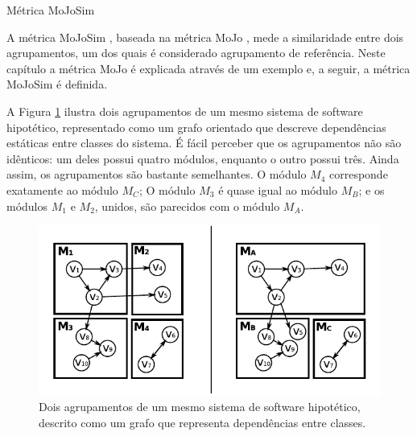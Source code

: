 \begin{chapter}{Métrica MoJoSim} \label{cap:mojosim}

A métrica MoJoSim \cite{Bittencourt2009}, baseada na métrica MoJo \cite{Tzerpos1999}, mede a similaridade entre dois agrupamentos, um dos quais é considerado agrupamento de referência. Neste capítulo a métrica MoJo é explicada através de um exemplo e, a seguir, a métrica MoJoSim é definida.



A Figura \ref{fig:mojo} ilustra dois agrupamentos de um mesmo sistema de software hipotético, representado como um grafo orientado que descreve dependências estáticas entre classes do sistema. É fácil perceber que os agrupamentos não são idênticos: um deles possui quatro módulos, enquanto o outro possui três. Ainda assim, os agrupamentos são bastante semelhantes. O módulo $M_4$ corresponde exatamente ao módulo $M_C$; O módulo $M_3$ é quase igual ao módulo $M_B$; e os módulos $M_1$ e $M_2$, unidos, são parecidos com o módulo $M_A$.

\begin{figure}[htbp]
	\centering
		\includegraphics[scale=1]{figuras/redes-dupla}
	\caption{Dois agrupamentos de um mesmo sistema de software hipotético, descrito como um grafo que representa dependências entre classes.}
	\label{fig:mojo}
\end{figure}


\end{chapter}
